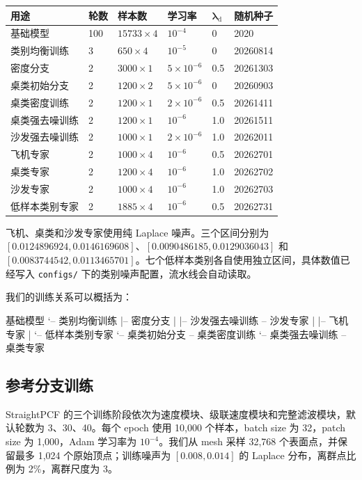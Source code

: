 \documentclass[UTF8,a4paper,11pt,fontset=fandol]{ctexart}
\newcommand{\code}[1]{\nolinkurl{#1}}
\begin{document}
\begin{longtable}{>{\raggedright\arraybackslash}p{3.5cm}p{1.5cm}p{2.4cm}p{2.2cm}p{2cm}p{2.2cm}}
\toprule
\textbf{用途} & \textbf{轮数} & \textbf{样本数} & \textbf{学习率} & $\boldsymbol{\lambda_{\mathrm d}}$ & \textbf{随机种子} \\
\midrule
\endhead
基础模型 & 100 & $15733\times4$ & $10^{-4}$ & 0 & 2020 \\
类别均衡训练 & 3 & $650\times4$ & $10^{-5}$ & 0 & 20260814 \\
密度分支 & 2 & $3000\times1$ & $5\times10^{-6}$ & 0.5 & 20261303 \\
桌类初始分支 & 2 & $1200\times2$ & $5\times10^{-6}$ & 0 & 20260903 \\
桌类密度训练 & 2 & $1200\times1$ & $2\times10^{-6}$ & 0.5 & 20261411 \\
桌类强去噪训练 & 2 & $1200\times1$ & $10^{-6}$ & 1.0 & 20261511 \\
沙发强去噪训练 & 2 & $1000\times1$ & $2\times10^{-6}$ & 1.0 & 20262011 \\
飞机专家 & 2 & $1000\times4$ & $10^{-6}$ & 0.5 & 20262701 \\
桌类专家 & 2 & $1200\times4$ & $10^{-6}$ & 1.0 & 20262702 \\
沙发专家 & 2 & $1000\times4$ & $10^{-6}$ & 1.0 & 20262703 \\
低样本类别专家 & 2 & $1885\times4$ & $10^{-6}$ & 0.5 & 20262731 \\
\bottomrule
\end{longtable}

飞机、桌类和沙发专家使用纯 Laplace 噪声。三个区间分别为 $[0.0124896924,0.0146169608]$、$[0.0090486185,0.0129036043]$ 和 $[0.0083744542,0.0113465701]$。七个低样本类别各自使用独立区间，具体数值已经写入 \code{configs/} 下的类别噪声配置，流水线会自动读取。

我们的训练关系可以概括为：

\begin{CodeBlock}
基础模型
`-- 类别均衡训练
    |-- 密度分支
    |   |-- 沙发强去噪训练 -- 沙发专家
    |   |-- 飞机专家
    |   `-- 低样本类别专家
    `-- 桌类初始分支 -- 桌类密度训练
        `-- 桌类强去噪训练 -- 桌类专家
\end{CodeBlock}

\subsection{参考分支训练}

StraightPCF 的三个训练阶段依次为速度模块、级联速度模块和完整滤波模块，默认轮数为 3、30、40。每个 epoch 使用 10,000 个样本，batch size 为 32，patch size 为 1,000，Adam 学习率为 $10^{-4}$。我们从 mesh 采样 32,768 个表面点，并保留最多 1,024 个原始顶点；训练噪声为 $[0.008,0.014]$ 的 Laplace 分布，离群点比例为 2\%，离群尺度为 3。
\end{document}

